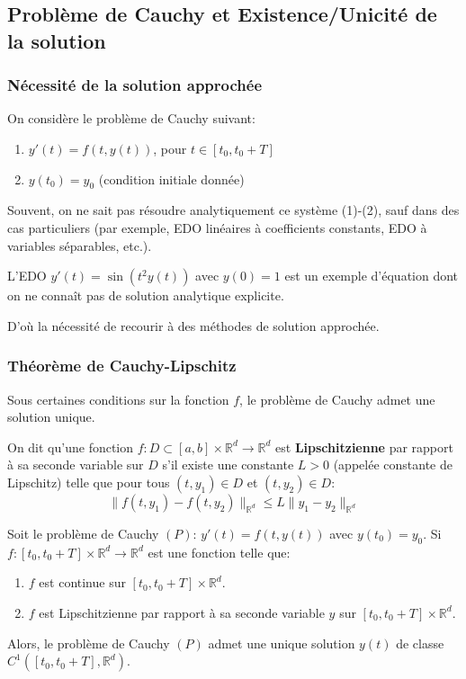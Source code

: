 \subsection{Problème de Cauchy et Existence/Unicité de la solution}
\label{ssec:cauchy_existence_unicite}

\subsubsection{Nécessité de la solution approchée}
\label{sssec:necessite_solution_approchee}
On considère le problème de Cauchy suivant:
\begin{enumerate}
    \item $y'(t) = f(t, y(t))$, pour $t \in [t_0, t_0+T]$
    \item $y(t_0) = y_0$ (condition initiale donnée)
\end{enumerate}
Souvent, on ne sait pas résoudre analytiquement ce système (1)-(2), sauf dans des cas particuliers (par exemple, EDO linéaires à coefficients constants, EDO à variables séparables, etc.).
\begin{example}
L'EDO $y'(t) = \sin(t^2 y(t))$ avec $y(0)=1$ est un exemple d'équation dont on ne connaît pas de solution analytique explicite.
\end{example}
D'où la nécessité de recourir à des méthodes de solution approchée.

\subsubsection{Théorème de Cauchy-Lipschitz}
\label{sssec:cauchy_lipschitz}
Sous certaines conditions sur la fonction $f$, le problème de Cauchy admet une solution unique.
\begin{definition}
On dit qu'une fonction $f: D \subset [a,b] \times \mathbb{R}^d \to \mathbb{R}^d$ est \textbf{Lipschitzienne} par rapport à sa seconde variable sur $D$ s'il existe une constante $L > 0$ (appelée constante de Lipschitz) telle que pour tous $(t, y_1) \in D$ et $(t, y_2) \in D$:
\[ \|f(t,y_1) - f(t,y_2)\|_{\mathbb{R}^d} \le L \|y_1 - y_2\|_{\mathbb{R}^d} \]
\end{definition}

\begin{theorem}
Soit le problème de Cauchy $(P)$: $y'(t) = f(t,y(t))$ avec $y(t_0)=y_0$.
Si $f: [t_0, t_0+T] \times \mathbb{R}^d \to \mathbb{R}^d$ est une fonction telle que:
\begin{enumerate}
    \item $f$ est continue sur $[t_0, t_0+T] \times \mathbb{R}^d$.
    \item $f$ est Lipschitzienne par rapport à sa seconde variable $y$ sur $[t_0, t_0+T] \times \mathbb{R}^d$.
\end{enumerate}
Alors, le problème de Cauchy $(P)$ admet une unique solution $y(t)$ de classe $C^1([t_0, t_0+T], \mathbb{R}^d)$.
\end{theorem}

